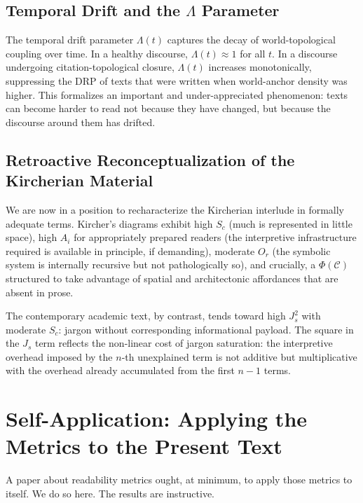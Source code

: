 \documentclass[12pt, a4paper]{article}
\begin{document}
\subsection{Temporal Drift and the $\Lambda$ Parameter}

The temporal drift parameter $\Lambda(t)$ captures the decay of world-topological coupling over time. In a healthy discourse, $\Lambda(t) \approx 1$ for all $t$. In a discourse undergoing citation-topological closure, $\Lambda(t)$ increases monotonically, suppressing the DRP of texts that were written when world-anchor density was higher. This formalizes an important and under-appreciated phenomenon: texts can become harder to read not because they have changed, but because the discourse around them has drifted.

\subsection{Retroactive Reconceptualization of the Kircherian Material}
\label{sec:retroactive}

We are now in a position to recharacterize the Kircherian interlude in formally adequate terms. Kircher's diagrams exhibit high $S_c$ (much is represented in little space), high $A_i$ for appropriately prepared readers (the interpretive infrastructure required is available in principle, if demanding), moderate $O_r$ (the symbolic system is internally recursive but not pathologically so), and crucially, a $\Phi(\mathcal{C})$ structured to take advantage of spatial and architectonic affordances that are absent in prose.

The contemporary academic text, by contrast, tends toward high $J_s^2$ with moderate $S_c$: jargon without corresponding informational payload. The square in the $J_s$ term reflects the non-linear cost of jargon saturation: the interpretive overhead imposed by the $n$-th unexplained term is not additive but multiplicative with the overhead already accumulated from the first $n{-}1$ terms.


\section{Self-Application: Applying the Metrics to the Present Text}

A paper about readability metrics ought, at minimum, to apply those metrics to itself. We do so here. The results are instructive.
\end{document}
